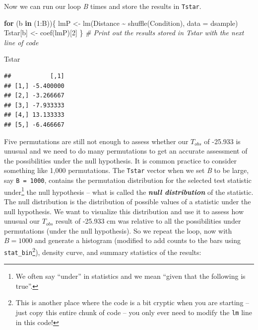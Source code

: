 \documentclass[
]{book}
\newenvironment{Shaded}{\begin{snugshade}}{\end{snugshade}}
\newcommand{\AttributeTok}[1]{\textcolor[rgb]{0.77,0.63,0.00}{#1}}
\newcommand{\CommentTok}[1]{\textcolor[rgb]{0.56,0.35,0.01}{\textit{#1}}}
\newcommand{\ControlFlowTok}[1]{\textcolor[rgb]{0.13,0.29,0.53}{\textbf{#1}}}
\newcommand{\DecValTok}[1]{\textcolor[rgb]{0.00,0.00,0.81}{#1}}
\newcommand{\FunctionTok}[1]{\textcolor[rgb]{0.00,0.00,0.00}{#1}}
\newcommand{\NormalTok}[1]{#1}
\newcommand{\OtherTok}[1]{\textcolor[rgb]{0.56,0.35,0.01}{#1}}
\newcommand{\SpecialCharTok}[1]{\textcolor[rgb]{0.00,0.00,0.00}{#1}}
\begin{document}
Now we can run our loop \emph{B} times and store the results in \texttt{Tstar}.

\begin{Shaded}
\begin{Highlighting}[]
\ControlFlowTok{for}\NormalTok{ (b }\ControlFlowTok{in}\NormalTok{ (}\DecValTok{1}\SpecialCharTok{:}\NormalTok{B))\{}
\NormalTok{  lmP }\OtherTok{\textless{}{-}} \FunctionTok{lm}\NormalTok{(Distance }\SpecialCharTok{\textasciitilde{}} \FunctionTok{shuffle}\NormalTok{(Condition), }\AttributeTok{data =}\NormalTok{ dsample)}
\NormalTok{  Tstar[b] }\OtherTok{\textless{}{-}} \FunctionTok{coef}\NormalTok{(lmP)[}\DecValTok{2}\NormalTok{]}
\NormalTok{\}}
\CommentTok{\# Print out the results stored in Tstar with the next line of code}
\end{Highlighting}
\end{Shaded}

\newpage

\begin{Shaded}
\begin{Highlighting}[]
\NormalTok{Tstar}
\end{Highlighting}
\end{Shaded}

\begin{verbatim}
##           [,1]
## [1,] -5.400000
## [2,] -3.266667
## [3,] -7.933333
## [4,] 13.133333
## [5,] -6.466667
\end{verbatim}

\indent Five permutations are still not enough to assess whether our \(T_{obs}\)
of -25.933 is unusual and we need to do many permutations to get an accurate
assessment of the possibilities under the null hypothesis.
It is common practice
to consider something like 1,000 permutations. The \texttt{Tstar} vector when we set
\emph{B} to be large, say \texttt{B\ =\ 1000}, contains the permutation distribution  for the
selected test statistic under\footnote{We often say
  ``under'' in statistics and we mean ``given that the following is true''.} the null
hypothesis -- what is called the \textbf{\emph{null distribution}} of the statistic. The
null distribution is the distribution of possible values of a statistic
under the null hypothesis. We want to visualize this distribution and use it to
assess how unusual our \(T_{obs}\) result of -25.933 cm was relative to all the
possibilities under permutations (under the null hypothesis). So we repeat the
loop, now with \(B = 1000\) and generate a histogram (modified to add counts to the bars using \texttt{stat\_bin}\footnote{This is another place where the code is a bit cryptic when you are starting -- just copy this entire chunk of code -- you only ever need to modify the \texttt{lm} line in this code!}), density curve, and summary
statistics of the results:
\end{document}
